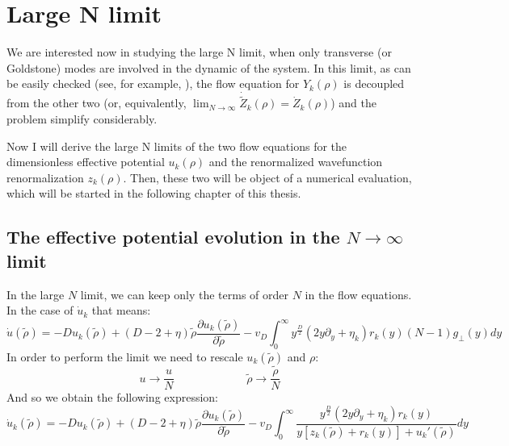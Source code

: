 \section{Large N limit}
We are interested now in studying the large N limit, when only transverse (or Goldstone) modes are involved in the dynamic 
of the system. In this limit, as can be easily checked (see, for example, \cite{morristurner}), the flow equation for $Y_k(\rho)$ is decoupled from the other two 
(or, equivalently, $\lim_{N\to \infty} \dot{{\widetilde{Z}}}_k(\rho) = \dot{Z}_k(\rho) $) and the problem simplify considerably.

Now I will derive the large N limits of the two flow equations for the dimensionless effective potential $u_k(\rho)$ and the renormalized wavefunction
renormalization $z_k(\rho)$. Then, these two will be object of a numerical evaluation, which will be started in the following chapter of this thesis.

\subsection{The effective potential evolution in the $N \to\infty$ limit}
In the large $N$ limit, we can keep only the terms of order $N$ in the flow equations. In the case of $\dot{u}_k$ that means:
\begin{equation}
\dot{u}(\widetilde{\rho}) = -D  u_k(\widetilde{\rho}) +(D - 2 + \eta)\widetilde{\rho}\frac{\partial u_k(\widetilde{\rho})}{\partial \widetilde{\rho}} - v_D \int_0^\infty y^{\frac{D}{2}}  (2y\partial_y + \eta_k) r_k(y) (N-1){g_\perp(y)} dy
\end{equation}
In order to perform the limit we need to rescale $u_k(\widetilde\rho)$ and $\rho$:
$$u \to \frac{u}{N} \ \ \ \ \ \ \ \ \ \  \ \ \ \ \ \  \ \ \ \ \ \ \  \ \ \ \ \ \   \widetilde{\rho} \to \frac{\widetilde{\rho}}{N} $$
And so we obtain the following expression:
\begin{equation}\label{upuntolargeN}
\dot{u}_k(\widetilde{\rho}) = -D  u_k(\widetilde{\rho}) +(D - 2 + \eta)\widetilde{\rho}\frac{\partial u_k(\widetilde{\rho})}{\partial \widetilde{\rho}} - v_D \int_0^\infty  \frac{y^{\frac{D}{2}} (2y\partial_y + \eta_k) r_k(y)}{y[z_k(\widetilde{\rho}) + r_k(y)] + u_k'(\widetilde{\rho})} dy 
\end{equation}


